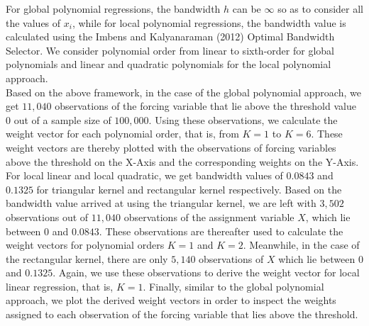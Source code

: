 \documentclass[fleqn]{article}
\begin{document}
    For global polynomial regressions, the bandwidth $h$ can be $\infty$ so as to consider all the values of $x_{i}$, while for local polynomial regressions, the bandwidth value is calculated using the Imbens and Kalyanaraman (2012) Optimal Bandwidth Selector\cite{imbens2012optimal}. We consider polynomial order from linear to sixth-order for global polynomials and linear and quadratic polynomials for the local polynomial approach.\\

    Based on the above framework, in the case of the global polynomial approach, we get $11,040$ observations of the forcing variable that lie above the threshold value $0$ out of a sample size of $100,000$. Using these observations, we calculate the weight vector for each polynomial order, that is, from $K=1$ to $K=6$. These weight vectors are thereby plotted with the observations of forcing variables above the threshold on the X-Axis and the corresponding weights on the Y-Axis.\\

    For local linear and local quadratic, we get bandwidth values of $0.0843$ and $0.1325$ for triangular kernel and rectangular kernel respectively. Based on the bandwidth value arrived at using the triangular kernel, we are left with $3,502$ observations out of $11,040$ observations of the assignment variable $X$, which lie between $0$ and $0.0843$. These observations are thereafter used to calculate the weight vectors for polynomial orders $K=1$ and $K=2$. Meanwhile, in the case of the rectangular kernel, there are only $5,140$ observations of $X$ which lie between $0$ and $0.1325$. Again, we use these observations to derive the weight vector for local linear regression, that is, $K=1$. Finally, similar to the global polynomial approach, we plot the derived weight vectors in order to inspect the weights assigned to each observation of the forcing variable that lies above the threshold.\\
    
\end{document}
